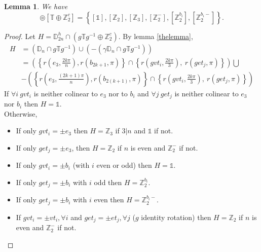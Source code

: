 \documentclass[11pt,a4paper]{amsart}
\newtheorem{lem}[thm]{Lemma}
\theoremstyle{definition}
\newcommand{\ZZ}{\mathbb{Z}}                %
\newcommand{\tetra}{\mathbb{T}}             %
\newcommand{\DD}{\mathbb{D}}                %
\newcommand{\1}{\mathds{1}}		            %
\newcommand{\set}[1]{\left\{#1\right\}}     %
\begin{document}
\begin{lem}
We have
\begin{equation*}
[\DD_{2n}^{h}] \circledcirc [\tetra \oplus \ZZ_2^c]=\set{[\1],[\ZZ_2],[\ZZ_3],[\ZZ_2^-],[\ZZ_2^{b_i}],[\ZZ_{2}^{b_i-}]}.
\end{equation*}
\end{lem}
\begin{proof}
Let $H=\DD_{2n}^h \cap (g\tetra g^{-1} \oplus \ZZ_2^c)$.
By lemma \ref{thelemma},
\begin{align*}
H&=(\DD_n\cap g \tetra g^{-1})\cup (-(\gamma\DD_n\cap g \tetra g^{-1}))\\
&=\left(\set{r(e_3,\frac{2k\pi}{n}),r(b_{2k+1},\pi)}\cap \set{r(gvt_i,\frac{2k\pi}{3}),\ r(get_j,\pi)}\right)\bigcup\\
&-\left(\set{r(e_3,\frac{(2k+1)\pi}{n}),r(b_{2(k+1)},\pi)}\cap \set{r(gvt_i,\frac{2k\pi}{3}),\ r(get_j,\pi)}\right)
\end{align*}
If $\forall i\ gvt_i$ is neither colinear to $e_3$ nor to $b_i$ and $\forall j\ get_j$ is neither colinear to $e_3$ nor $b_i$ then $H=\1$.\\
Otherwise,
\begin{itemize}
\item If only $gvt_i=\pm e_3$ then $H=\ZZ_3$ if $3|n$ and $\1$ if not.
\item If only $get_j=\pm e_3$, then $H=\ZZ_2$ if $n$ is even and $\ZZ_2^-$ if not.
\item If only $gvt_i=\pm b_i$ (with $i$ even or odd) then $H=\1$.
\item If only $get_j=\pm b_i$ with $i$ odd then $H=\ZZ_2^{b_i}.$
\item If only $get_j=\pm b_i$ with $i$ even then $H=\ZZ_2^{b_i-}.$
\item If $gvt_i=\pm vt_i, \forall i$ and $get_j=\pm et_j, \forall j$ ($g$ identity rotation) then $H=\ZZ_2$ if $n$ is even and $\ZZ_2^-$ if not.
\end{itemize}
\end{proof}
\end{document}
